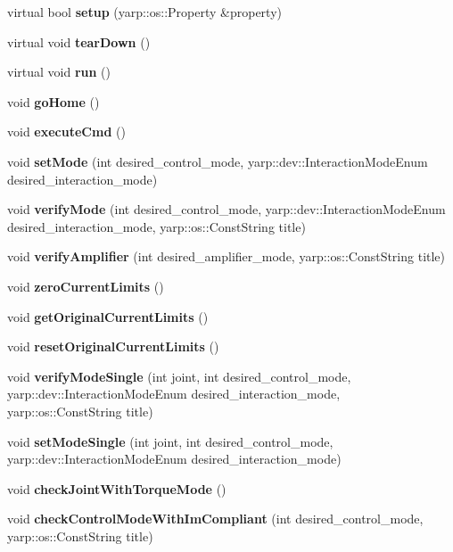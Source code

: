 \begin{DoxyCompactItemize}
\item 
\mbox{\label{classControlModes_a906098cdeee49ee608ec27e14d17fe4a}} 
virtual bool {\bfseries setup} (yarp\+::os\+::\+Property \&property)
\item 
\mbox{\label{classControlModes_a96e49aa347dc1a743e5f506672f72dc5}} 
virtual void {\bfseries tear\+Down} ()
\item 
\mbox{\label{classControlModes_ae438acaf6677471f962d3d6eec430b52}} 
virtual void {\bfseries run} ()
\item 
\mbox{\label{classControlModes_aba99419a0f329ef8db34b3247c9e8461}} 
void {\bfseries go\+Home} ()
\item 
\mbox{\label{classControlModes_a499fb7c42dc501895e41fb8e7922f3fb}} 
void {\bfseries execute\+Cmd} ()
\item 
\mbox{\label{classControlModes_a2db54b3f482b49317a73caffba85fe98}} 
void {\bfseries set\+Mode} (int desired\+\_\+control\+\_\+mode, yarp\+::dev\+::\+Interaction\+Mode\+Enum desired\+\_\+interaction\+\_\+mode)
\item 
\mbox{\label{classControlModes_a79dc3f6647b41b2b1047e0fb769930db}} 
void {\bfseries verify\+Mode} (int desired\+\_\+control\+\_\+mode, yarp\+::dev\+::\+Interaction\+Mode\+Enum desired\+\_\+interaction\+\_\+mode, yarp\+::os\+::\+Const\+String title)
\item 
\mbox{\label{classControlModes_ac4b07380ed5ef4d060320db5e27cefd5}} 
void {\bfseries verify\+Amplifier} (int desired\+\_\+amplifier\+\_\+mode, yarp\+::os\+::\+Const\+String title)
\item 
\mbox{\label{classControlModes_af8d034ed81bad265bef55868c93dccbb}} 
void {\bfseries zero\+Current\+Limits} ()
\item 
\mbox{\label{classControlModes_a07b40de5590b6de6465275f120cc0278}} 
void {\bfseries get\+Original\+Current\+Limits} ()
\item 
\mbox{\label{classControlModes_a4829a8e1d1d0a9bc97d6f99a39f200fb}} 
void {\bfseries reset\+Original\+Current\+Limits} ()
\item 
\mbox{\label{classControlModes_a484beacf0d13cdea8a6e2f42886a151e}} 
void {\bfseries verify\+Mode\+Single} (int joint, int desired\+\_\+control\+\_\+mode, yarp\+::dev\+::\+Interaction\+Mode\+Enum desired\+\_\+interaction\+\_\+mode, yarp\+::os\+::\+Const\+String title)
\item 
\mbox{\label{classControlModes_af9a2fe5d8cdeba9c6a4c6419b7e10c26}} 
void {\bfseries set\+Mode\+Single} (int joint, int desired\+\_\+control\+\_\+mode, yarp\+::dev\+::\+Interaction\+Mode\+Enum desired\+\_\+interaction\+\_\+mode)
\item 
\mbox{\label{classControlModes_a5a886c22a344441ff40d7223b1a9b7aa}} 
void {\bfseries check\+Joint\+With\+Torque\+Mode} ()
\item 
\mbox{\label{classControlModes_ae0706d70e86af67fbff3d01e58e6cb86}} 
void {\bfseries check\+Control\+Mode\+With\+Im\+Compliant} (int desired\+\_\+control\+\_\+mode, yarp\+::os\+::\+Const\+String title)
\end{DoxyCompactItemize}


